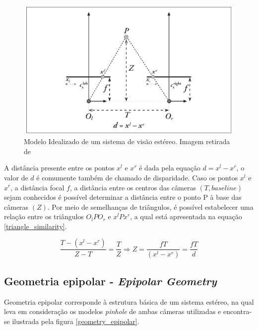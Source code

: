\begin{figure}[H]
 	\centering
 	\includegraphics[scale=0.35]{./Resources/bradski/stereo_image_geometric_model.png}
 	\caption{Modelo Idealizado de um sistema de visão estéreo. Imagem retirada de \cite{Bradski2008}}
 	\label{stereo_image_geometric_model}
\end{figure}

A distância presente entre os pontos $x^l$ e $x^r$ é dada pela equação $d = x^l - x^r$, o valor de $d$ é comumente também de chamado de disparidade. Caso os pontos $x^l$ e $x^r$, a distância focal $f$, a distância entre os centros das câmeras $(T,baseline)$ sejam conhecidos é possível determinar a distância entre o ponto P à base das câmeras $(Z)$. Por meio de semelhanças de triângulos, é possível estabelecer uma relação entre os triângulos $O_lPO_r$ e $x^lPx^r$, a qual está apresentada na equação \ref{triangle_similarity}.

\begin{equation}
\label{triangle_similarity}
\frac{T - (x^l-x^r)}{Z-T} = \frac{T}{Z} \Rightarrow Z = \frac{fT}{(x^l-x^r)} = \frac{fT}{d}
\end{equation}


\subsection{Geometria epipolar - \textit{Epipolar Geometry}}

Geometria epipolar corresponde à estrutura básica de um sistema estéreo, na qual leva em consideração os modelos \textit{pinhole} de ambas câmeras utilizadas e encontra-se ilustrada pela figura \ref{geometry_epipolar}. 

